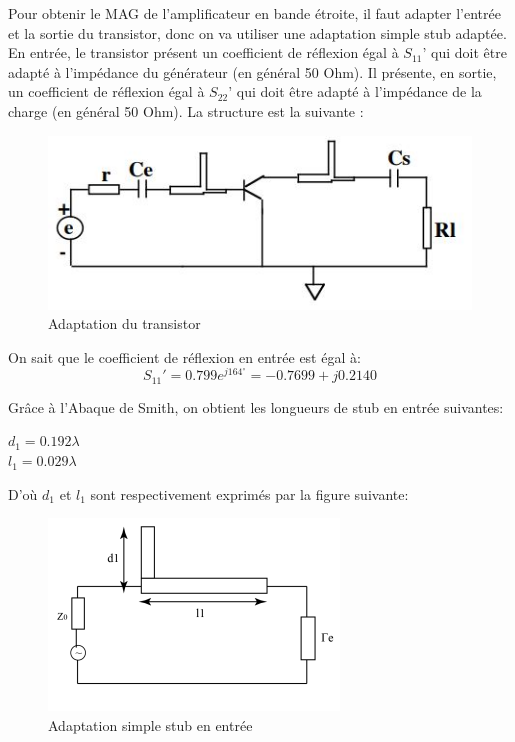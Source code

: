\documentclass[french]{article}
\begin{document}
Pour obtenir le MAG de l’amplificateur en bande étroite, il faut adapter l’entrée et la sortie du transistor, donc on va utiliser une adaptation simple stub adaptée. En entrée, le transistor présent un coefficient de réflexion égal à $S_{11}’$ qui doit être adapté à l’impédance du générateur (en général 50 Ohm). Il présente, en sortie, un coefficient de réflexion égal à $S_{22}’$ qui doit être adapté à l’impédance de la charge (en général 50 Ohm). La structure est la suivante :

\begin{figure}[H]
	\centering
	\includegraphics[width=0.6\linewidth]{../5SynthAmp/adaptation_e_s}
	\caption{Adaptation du transistor}
	\label{fig:adaptation_e_s}
\end{figure}

On sait que le coefficient de réflexion en entrée est égal à:
\begin{equation}
	S_{11}'=0.799e^{j164^{\circ}}=-0.7699+j0.2140
\end{equation}

Grâce à l’Abaque de Smith, on obtient les longueurs de stub en entrée suivantes:

{\centering
	$d_{1}=0.192\lambda$\\
	$l_{1}=0.029\lambda$\\
}
	
D’où $d_{1}$ et $l_{1}$ sont respectivement exprimés par la figure suivante:
\begin{figure}[H]
	\centering
	\includegraphics[width=0.55\linewidth]{../5SynthAmp/simple_stub_e}
	\caption{Adaptation simple stub en entrée}
	\label{fig:simple_stub_e}
\end{figure}
\end{document}

